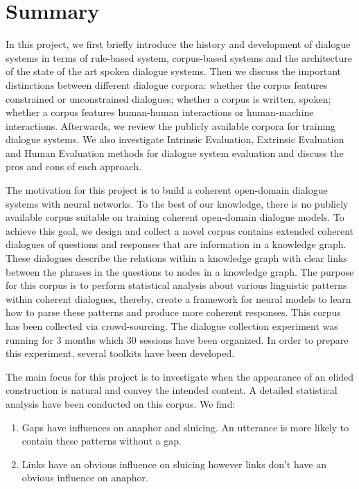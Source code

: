 \documentclass[bsc,frontabs,twoside,singlespacing,parskip,deptreport]{infthesis}     %
\begin{document}
\section{Summary}

In this project, we first briefly introduce the history and development of dialogue systems in terms of rule-based system, corpus-based systems and the architecture of the state of the art spoken dialogue systems. Then we discuss the important distinctions between different dialogue corpora: whether the corpus features constrained or unconstrained dialogues; whether a corpus is written, spoken; whether a corpus features human-human interactions or human-machine interactions. Afterwards, we review the publicly available corpora for training dialogue systems. We also investigate Intrinsic Evaluation, Extrinsic Evaluation and Human Evaluation methods for dialogue system evaluation and discuss the pros and cons of each approach.

The motivation for this project is to build a coherent open-domain dialogue systems with neural networks. To the best of our knowledge, there is no publicly available corpus suitable on training coherent open-domain dialogue models. To achieve this goal, we design and collect a novel corpus contains extended coherent dialogues of questions and responses that are information in a knowledge graph. These dialogues describe the relations within a knowledge graph with clear links between the phrases in the questions to nodes in a knowledge graph. The purpose for this corpus is to perform statistical analysis about various linguistic patterns within coherent dialogues, thereby, create a framework for neural models to learn how to parse these patterns and produce more coherent responses. This corpus has been collected via crowd-sourcing. The dialogue collection experiment was running for 3 months which 30 sessions have been organized. In order to prepare this experiment, several toolkits have been developed.

The main focus for this project is to investigate when the appearance of an elided construction is natural and convey the intended content. A detailed statistical analysis have been conducted on this corpus. We find:

\begin{enumerate}
   \item Gaps have influences on anaphor and sluicing. An utterance is more likely to contain these patterns without a gap.

   \item Links have an obvious influence on sluicing however links don’t have an obvious influence on anaphor.
 
\end{enumerate}
\end{document}
